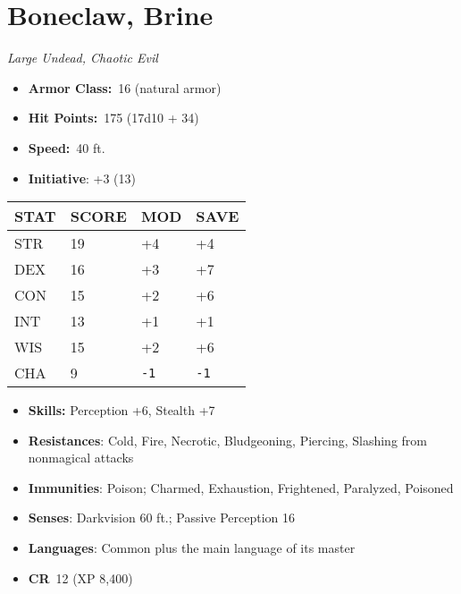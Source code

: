\documentclass[10pt,twocolumn]{article}
\let\oldtextbf\textbf
\renewcommand{\textbf}[1]{\oldtextbf{{#1}}}
\providecommand{\tightlist}{
  \setlength{\itemsep}{4pt}
  \setlength{\topsep}{0pt}
  \setlength{\parsep}{0pt}
  \setlength{\parskip}{0pt}
  \setlength{\partopsep}{0pt}
}
\begin{document}
\section{Boneclaw, Brine}\label{boneclaw-brine}

\emph{Large Undead, Chaotic Evil}

\setlength{\itemsep}{0pt}

\begin{itemize}
\tightlist
\item
  \textbf{Armor Class:}~16 (natural armor)
\item
  \textbf{Hit Points:}~175 (17d10 + 34)
\item
  \textbf{Speed:}~40 ft.
\item
  \textbf{Initiative}: +3 (13)
\end{itemize}

\begin{center}
{\sffamily\fontsize{8pt}{8pt}\selectfont
{}
\begin{tabular}{llll}
\toprule
\textbf{STAT} & \textbf{SCORE} & \textbf{MOD} & \textbf{SAVE} \\
\midrule
STR & 19 & +4 & +4 \\
DEX & 16 & +3 & +7 \\
CON & 15 & +2 & +6 \\
INT & 13 & +1 & +1 \\
WIS & 15 & +2 & +6 \\
CHA & 9 & \texttt{-1} & \texttt{-1} \\
\bottomrule
\end{tabular}}
\end{center}

\setlength{\itemsep}{0pt}

\begin{itemize}
\tightlist
\item
  \textbf{Skills:} Perception +6, Stealth +7
\item
  \textbf{Resistances}: Cold, Fire, Necrotic, Bludgeoning, Piercing,
  Slashing from nonmagical attacks
\item
  \textbf{Immunities}: Poison; Charmed, Exhaustion, Frightened,
  Paralyzed, Poisoned
\item
  \textbf{Senses}: Darkvision 60 ft.; Passive Perception 16
\item
  \textbf{Languages}: Common plus the main language of its master
\item
  \textbf{CR}~12 (XP 8,400)
\end{itemize}
\end{document}
